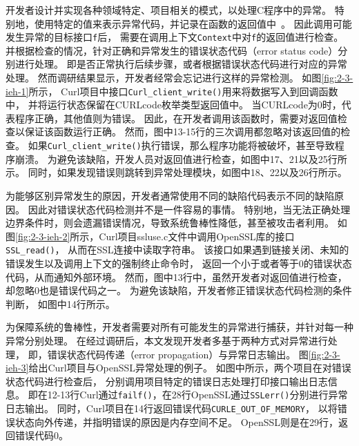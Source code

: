 开发者设计并实现各种领域特定、项目相关的模式，以处理C程序中的异常。
特别地，使用特定的值来表示异常代码，并记录在函数的返回值中~\cite{08-fast-eio}。
因此调用可能发生异常的目标接口\texttt{f}后，
需要在调用上下文\texttt{Context}中对\texttt{f}的返回值进行检查。
并根据检查的情况，针对正确和异常发生的错误状态代码（error status code）分别进行处理。
即是否正常执行后续步骤，或者根据错误状态代码进行对应的异常处理。
然而调研结果显示，开发者经常会忘记进行这样的异常检测。
如图\ref{fig:2-3-ieh-1}所示，
Curl项目中接口\texttt{Curl\_client\_write()}用来将数据写入到回调函数中，
并将运行状态保留在CURLcode枚举类型返回值中。
当CURLcode为0时，代表程序正确，其他值则为错误。
因此，在开发者调用该函数时，需要对返回值检查以保证该函数运行正确。
然而，图中13-15行的三次调用都忽略对该返回值的检查。
如果\texttt{Curl\_client\_write()}执行错误，那么程序功能将被破坏，甚至导致程序崩溃。
为避免该缺陷，开发人员对返回值进行检查，如图中17、21以及25行所示。
同时，如果发现错误则跳转到异常处理模块，如图中18、22以及26行所示。



为能够区别异常发生的原因，开发者通常使用不同的缺陷代码表示不同的缺陷原因。
因此对错误状态代码检测并不是一件容易的事情。
特别地，当无法正确处理边界条件时，则会遗漏错误情况，导致系统鲁棒性降低，甚至被攻击者利用。
如图\ref{fig:2-3-ieh-2}所示，Curl项目ssluse.c文件中调用OpenSSL库的接口\texttt{SSL\_read()}，
从而在SSL连接中读取字符串。
该接口如果遇到链接关闭、未知的错误发生以及调用上下文的强制终止命令时，
返回一个小于或者等于0的错误状态代码，从而通知外部环境。
然而，图中13行中，虽然开发者对返回值进行检查，却忽略0也是错误代码之一。
为避免该缺陷，开发者修正错误状态代码检测的条件判断，
如图中14行所示。



为保障系统的鲁棒性，开发者需要对所有可能发生的异常进行捕获，并针对每一种异常分别处理。
在经过调研后，本文发现开发者多基于两种方式对异常进行处理，
即，错误状态代码传递（error propagation）与异常日志输出。
图\ref{fig:2-3-ieh-3}给出Curl项目与OpenSSL异常处理的例子。
如图中所示，两个项目在对错误状态代码进行检查后，
分别调用项目特定的错误日志处理打印接口输出日志信息。
即在12-13行Curl通过\texttt{failf()}，在28行OpenSSL通过\texttt{SSLerr()}分别进行异常日志输出。
同时，Curl项目在14行返回错误代码\texttt{CURLE\_OUT\_OF\_MEMORY}，
以将错误状态向外传递，并指明错误的原因是内存空间不足。
OpenSSL则是在29行，返回错误代码0。

\vspace*{10pt}
\begin{center}
	\noindent{}
\end{center}


